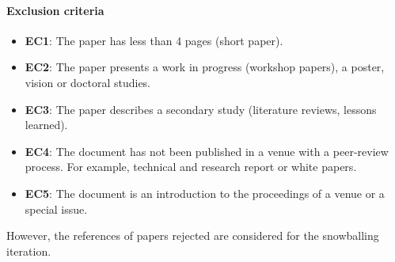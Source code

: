 \paragraph{Exclusion criteria}
\begin{itemize}
	\item \textbf{EC1}: The paper has less than 4 pages (short paper).
	\item \textbf{EC2}: The paper presents a work in progress (workshop papers), a poster, vision or doctoral studies.
	\item \textbf{EC3}: The paper describes a secondary study (\eg literature reviews, lessons learned).
	\item \textbf{EC4}: The document has not been published in a venue with a peer-review process. For example, technical and research report or white papers.
	\item \textbf{EC5}: The document is an introduction to the proceedings of a venue or a special issue.
\end{itemize}

However, the references of papers rejected are considered for the snowballing iteration.